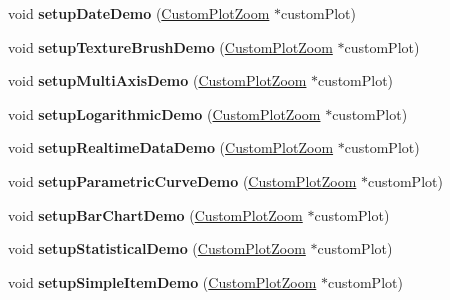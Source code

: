 \begin{DoxyCompactItemize}
void {\bfseries setup\+Date\+Demo} (\hyperlink{class_custom_plot_zoom}{Custom\+Plot\+Zoom} $\ast$custom\+Plot)
\item 
\mbox{\label{classplot_window_a7f3f8735323077129897a6e591dc94b6}} 
void {\bfseries setup\+Texture\+Brush\+Demo} (\hyperlink{class_custom_plot_zoom}{Custom\+Plot\+Zoom} $\ast$custom\+Plot)
\item 
\mbox{\label{classplot_window_aa6607be4d296fa3af225f7c9f62d82f4}} 
void {\bfseries setup\+Multi\+Axis\+Demo} (\hyperlink{class_custom_plot_zoom}{Custom\+Plot\+Zoom} $\ast$custom\+Plot)
\item 
\mbox{\label{classplot_window_a5a7eb2c23850320a443f8bbd07c72a2c}} 
void {\bfseries setup\+Logarithmic\+Demo} (\hyperlink{class_custom_plot_zoom}{Custom\+Plot\+Zoom} $\ast$custom\+Plot)
\item 
\mbox{\label{classplot_window_af482dc8bae6298a7d5ebdeea75aaf00d}} 
void {\bfseries setup\+Realtime\+Data\+Demo} (\hyperlink{class_custom_plot_zoom}{Custom\+Plot\+Zoom} $\ast$custom\+Plot)
\item 
\mbox{\label{classplot_window_a040953042af1f7eb58a57c6664885102}} 
void {\bfseries setup\+Parametric\+Curve\+Demo} (\hyperlink{class_custom_plot_zoom}{Custom\+Plot\+Zoom} $\ast$custom\+Plot)
\item 
\mbox{\label{classplot_window_aab06ef4b489f07afdde85a2c638743f0}} 
void {\bfseries setup\+Bar\+Chart\+Demo} (\hyperlink{class_custom_plot_zoom}{Custom\+Plot\+Zoom} $\ast$custom\+Plot)
\item 
\mbox{\label{classplot_window_a471d768598485989c12436522cfc8f53}} 
void {\bfseries setup\+Statistical\+Demo} (\hyperlink{class_custom_plot_zoom}{Custom\+Plot\+Zoom} $\ast$custom\+Plot)
\item 
\mbox{\label{classplot_window_a4ae41d9a84a60a5a52a74b27d92ea05b}} 
void {\bfseries setup\+Simple\+Item\+Demo} (\hyperlink{class_custom_plot_zoom}{Custom\+Plot\+Zoom} $\ast$custom\+Plot)
\item 
\mbox{\label{classplot_window_a3a7df4962ccac8a3f9905b0a650bd071}} 

\end{DoxyCompactItemize}
